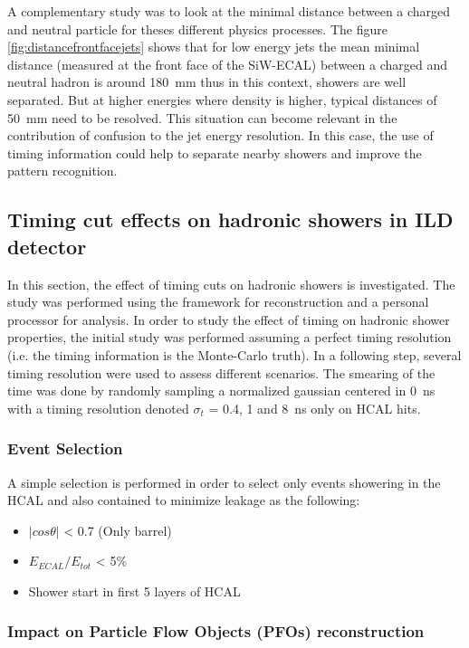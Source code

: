 A complementary study was to look at the minimal distance between a charged and neutral particle for theses different physics processes. The figure \ref{fig:distancefrontfacejets} shows that for low energy jets the mean minimal distance (measured at the front face of the SiW-ECAL) between a charged and neutral hadron is around \SI{180}{\milli\meter} thus in this context, showers are well separated. But at higher energies where density is higher, typical distances of \SI{50}{\milli\meter} need to be resolved. This situation can become relevant in the contribution of confusion to the jet energy resolution. In this case, the use of timing information could help to separate nearby showers and improve the pattern recognition.

\subsection{Timing cut effects on hadronic showers in ILD detector}

In this section, the effect of timing cuts on hadronic showers is investigated. The study was performed using the \ilcsoft framework for reconstruction and a personal \marlin processor for analysis. In order to study the effect of timing on hadronic shower properties, the initial study was performed assuming a perfect timing resolution (i.e. the timing information is the Monte-Carlo truth). In a following step, several timing resolution were used to assess different scenarios. The smearing of the time was done by randomly sampling a normalized gaussian centered in \SI{0}{\nano\second} with a timing resolution denoted $\sigma_{t}$ = 0.4, 1 and \SI{8}{\nano\second} only on HCAL hits.

\subsubsection{Event Selection}

A simple selection is performed in order to select only events showering in the HCAL and also contained to minimize leakage as the following:
\begin{itemize}
  \item $|cos\theta|$ < 0.7 (Only barrel)
  \item $E_{ECAL}/E_{tot}$ < 5\%
  \item Shower start in first 5 layers of HCAL
\end{itemize}

\subsubsection{Impact on Particle Flow Objects (PFOs) reconstruction}

